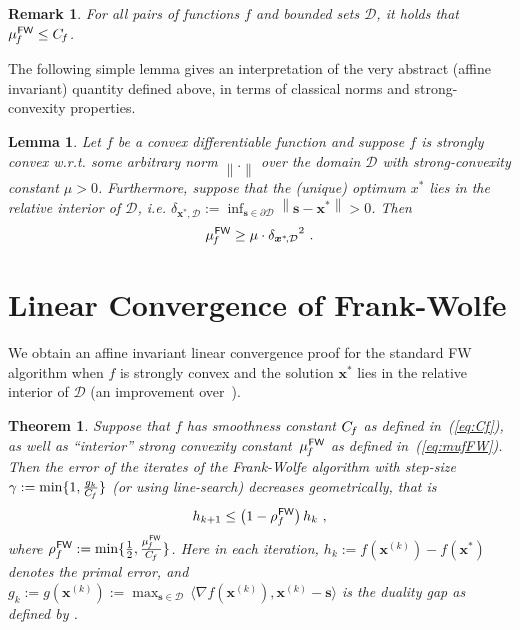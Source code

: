 \documentclass{article} %
\newtheorem{theorem}[definition]{Theorem}
\newtheorem{lemma}[definition]{Lemma}
\newtheorem{remark}[definition]{Remark}
\providecommand{\norm}[1]{\left\lVert#1\right\rVert}
\newcommand{\domain}{\mathcal{D}}
\newcommand{\stepsize}{\gamma}
\newcommand{\FW}{{\hspace{0.05em}\textsf{FW}}}
\newcommand{\Cf}{C_{\hspace{-0.08em}f}}
\newcommand{\strongConvFW}{\mu_{\hspace{-0.08em}f}^\FW}
\newcommand{\distToBoundary}{{\delta_{\x^*\!,\domain}}}
\newcommand{\x}{\bm{x}}
\newcommand{\s}{\bm{s}}
\newcommand{\0}{\mathbf{0}} %
\begin{document}
\begin{remark}
For all pairs of functions $f$ and bounded sets $\domain$, it holds that $\strongConvFW \le \Cf$.
\end{remark}\vspace{-2mm}

The following simple lemma gives an interpretation of the very abstract (affine invariant) quantity defined above, in terms of classical norms and strong-convexity properties.

\begin{lemma}\label{lem:muFWinterpretation}
Let $f$ be a convex differentiable function and suppose $f$ is \emph{strongly convex} w.r.t. some arbitrary norm $\norm{.}$ over the domain $\domain$ with strong-convexity constant $\mu>0$.
%
Furthermore, suppose that the (unique) optimum $x^*$ lies in the relative interior of $\domain$, i.e. $\distToBoundary := \inf_{\s\in\partial \domain} \norm{\s-\x^*} > 0$.
Then\vspace{-3mm}
\[
\strongConvFW \geq \mu \cdot \distToBoundary^2  \ .
\] %
\end{lemma}


%


\vspace{-3mm}
%
\section{Linear Convergence of Frank-Wolfe}\vspace{-2mm}%
%
We obtain an affine invariant linear convergence proof for the standard FW algorithm when $f$ is strongly convex and the solution $\x^*$ lies in the relative interior of $\domain$ (an improvement over~\cite{Guelat:1986fq}). %

\begin{theorem}\label{thm:linearConvergenceFW}
Suppose that $f$ has smoothness constant $\Cf$ as defined in~(\ref{eq:Cf}),
as well as ``interior'' strong convexity constant~$\strongConvFW$ as defined in~(\ref{eq:mufFW}).
%
%
Then the error of the iterates of the Frank-Wolfe algorithm with step-size $\stepsize := \min\{1, \frac{g_k}{\Cf} \}$
(or using line-search) decreases geometrically, that is\vspace{-2mm}
\[
h_{k+1} \leq \left(1-\rho_f^\FW\right) h_k \ , \vspace{-3mm}
\]
where $\rho_f^\FW := \min \{\frac{1}{2}, \frac{\strongConvFW}{\Cf} \}$. Here in each iteration, $h_k := f(\x^{(k)}) - f(\x^*)$ denotes the primal error, and $g_k :=  g(\x^{(k)}) := \displaystyle\max_{\s \in \domain} \,\big\langle \nabla f(\x^{(k)}), \x^{(k)} - \s  \big\rangle$ is the duality gap as defined by \cite{Jaggi:2013wg}.%
\end{theorem}
\end{document}
